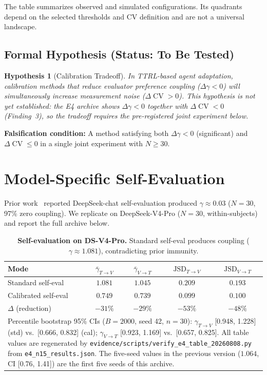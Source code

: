\documentclass[11pt]{article}
\DeclareMathOperator{\CV}{CV}
\newtheorem{hypothesis}{Hypothesis}
\begin{document}
The table summarizes observed and simulated configurations. Its quadrants depend on the selected thresholds and CV definition and are not a universal landscape.

\subsection{Formal Hypothesis (Status: To Be Tested)}

\begin{hypothesis}[Calibration Tradeoff]
In TTRL-based agent adaptation, calibration methods that reduce evaluator preference coupling ($\Delta\gamma < 0$) will simultaneously increase measurement noise ($\Delta\CV > 0$). This hypothesis is \emph{not yet established}: the E4 archive shows $\Delta\gamma < 0$ together with $\Delta\CV < 0$ (Finding~3), so the tradeoff requires the pre-registered joint experiment below.
\end{hypothesis}

\textbf{Falsification condition:} A method satisfying both $\Delta\gamma < 0$ (significant) and $\Delta\CV \leq 0$ in a single joint experiment with $N \geq 30$.


\section{Model-Specific Self-Evaluation}

Prior work~\citep{liu2026epc} reported DeepSeek-chat self-evaluation produced $\gamma \approx 0.03$ ($N{=}30$, 97\% zero coupling). We replicate on DeepSeek-V4-Pro ($N{=}30$, within-subjects) and report the full archive below.

\begin{table}[H]
\centering
\caption{\textbf{Self-evaluation on DS-V4-Pro.} Standard self-eval produces coupling ($\gamma \approx 1.081$), contradicting prior immunity.}
\begin{tabular}{@{}lcccc@{}}
\toprule
Mode & $\bar{\gamma}_{T \to V}$ & $\bar{\gamma}_{V \to T}$ & $\text{JSD}_{T \to V}$ & $\text{JSD}_{V \to T}$ \\
\midrule
Standard self-eval & $1.081$ & $1.045$ & $0.209$ & $0.193$ \\
Calibrated self-eval & $\mathbf{0.749}$ & $\mathbf{0.739}$ & $\mathbf{0.099}$ & $\mathbf{0.100}$ \\
\midrule
$\Delta$ (reduction) & $-31\%$ & $-29\%$ & $-53\%$ & $-48\%$ \\
\bottomrule
\multicolumn{5}{l}{\footnotesize Percentile bootstrap 95\% CIs ($B{=}2000$, seed 42, $n{=}30$): $\gamma_{T\to V}$ [0.948, 1.228] (std) vs.\ [0.666, 0.832] (cal); $\gamma_{V\to T}$ [0.923, 1.169] vs.\ [0.657, 0.825]. All table values are regenerated by \texttt{evidence/scripts/verify\_e4\_table\_20260808.py} from \texttt{e4\_n15\_results.json}. The five-seed values in the previous version ($1.064$, CI [0.76, 1.41]) are the first five seeds of this archive.} \\
\end{tabular}
\end{table}
\end{document}
